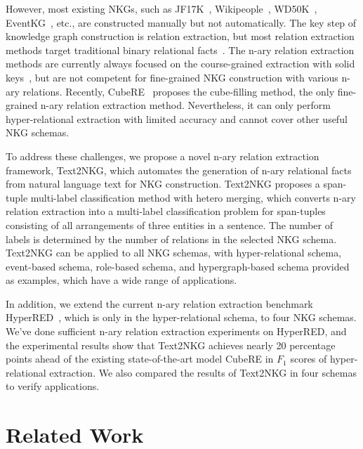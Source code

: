 \documentclass{article} \usepackage{iclr2024_conference,times}
\begin{document}
However, most existing NKGs, such as JF17K~\citep{m-TransH}, Wikipeople~\citep{NaLP}, WD50K~\citep{StarE}, EventKG~\citep{EventSurvey}, etc., are constructed manually but not automatically. The key step of knowledge graph construction is relation extraction, but most relation extraction methods target traditional binary relational facts~\citep{table-filling,PURE,PL-Marker}. The n-ary relation extraction methods are currently always focused on the course-grained extraction with solid keys~\citep{documentlevelNRE,ReSel}, but are not competent for fine-grained NKG construction with various n-ary relations. Recently, CubeRE~\citep{HyperRED} proposes the cube-filling method, the only fine-grained n-ary relation extraction method. Nevertheless, it can only perform hyper-relational extraction with limited accuracy and cannot cover other useful NKG schemas.

To address these challenges, we propose a novel n-ary relation extraction framework, Text2NKG, which automates the generation of n-ary relational facts from natural language text for NKG construction. Text2NKG proposes a span-tuple multi-label classification method with hetero merging, which converts n-ary relation extraction into a multi-label classification problem for span-tuples consisting of all arrangements of three entities in a sentence. The number of labels is determined by the number of relations in the selected NKG schema. Text2NKG can be applied to all NKG schemas, with hyper-relational schema, event-based schema, role-based schema, and hypergraph-based schema provided as examples, which have a wide range of applications.

In addition, we extend the current n-ary relation extraction benchmark HyperRED~\citep{HyperRED}, which is only in the hyper-relational schema, to four NKG schemas. We've done sufficient n-ary relation extraction experiments on HyperRED, and the experimental results show that Text2NKG achieves nearly 20 percentage points ahead of the existing state-of-the-art model CubeRE in $F_1$ scores of hyper-relational extraction. We also compared the results of Text2NKG in four schemas to verify applications. 







\section{Related Work}
\end{document}
